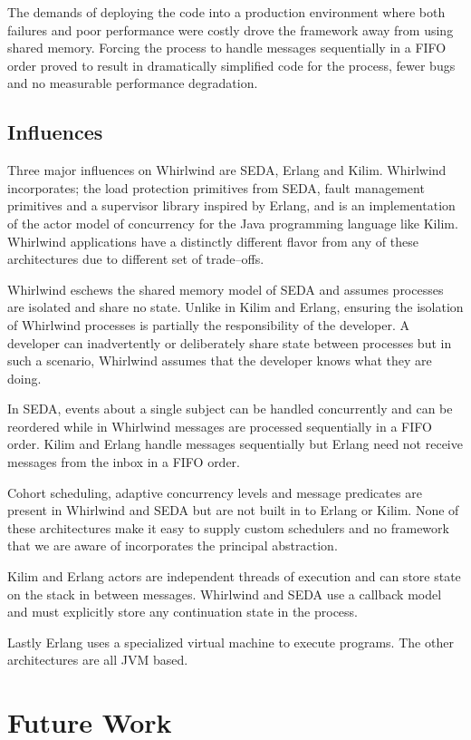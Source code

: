 \documentclass[conference]{IEEEtran}
\begin{document}
The demands of deploying the code into a production environment where both failures and poor performance were costly drove the framework away from using shared memory. Forcing the process to handle messages sequentially in a FIFO order proved to result in dramatically simplified code for the process, fewer bugs and no measurable performance degradation.

\subsection{Influences}

Three major influences on Whirlwind are SEDA, Erlang and Kilim. Whirlwind incorporates; the load protection primitives from SEDA, fault management primitives and a supervisor library inspired by Erlang, and is an implementation of the actor model of concurrency for the Java programming language like Kilim. Whirlwind applications have a distinctly different flavor from any of these architectures due to different set of trade--offs.

Whirlwind eschews the shared memory model of SEDA and assumes processes are isolated and share no state. Unlike in Kilim and Erlang, ensuring the isolation of Whirlwind processes is partially the responsibility of the developer. A developer can inadvertently or deliberately share state between processes but in such a scenario, Whirlwind assumes that the developer knows what they are doing. 

In SEDA, events about a single subject can be handled concurrently and can be reordered while in Whirlwind messages are processed sequentially in a FIFO order. Kilim and Erlang handle messages sequentially but Erlang need not receive messages from the inbox in a FIFO order.

Cohort scheduling, adaptive concurrency levels and message predicates are present in Whirlwind and SEDA but are not built in to Erlang or Kilim. None of these architectures make it easy to supply custom schedulers and no framework that we are aware of incorporates the principal abstraction. 

Kilim and Erlang actors are independent threads of execution and can store state on the stack in between messages. Whirlwind and SEDA use a callback model and must explicitly store any continuation state in the process.

Lastly Erlang uses a specialized virtual machine to execute programs. The other architectures are all JVM based.

\section{Future Work}
\end{document}
